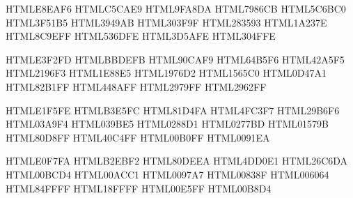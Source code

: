 \definecolor{Indigo-50}       {HTML}{E8EAF6}
\definecolor{Indigo-100}      {HTML}{C5CAE9}
\definecolor{Indigo-200}      {HTML}{9FA8DA}
\definecolor{Indigo-300}      {HTML}{7986CB}
\definecolor{Indigo-400}      {HTML}{5C6BC0}
\definecolor{Indigo-500}      {HTML}{3F51B5}
\definecolor{Indigo-600}      {HTML}{3949AB}
\definecolor{Indigo-700}      {HTML}{303F9F}
\definecolor{Indigo-800}      {HTML}{283593}
\definecolor{Indigo-900}      {HTML}{1A237E}
\definecolor{Indigo-A100}     {HTML}{8C9EFF}
\definecolor{Indigo-A200}     {HTML}{536DFE}
\definecolor{Indigo-A400}     {HTML}{3D5AFE}
\definecolor{Indigo-A700}     {HTML}{304FFE}

\definecolor{Blue-50}         {HTML}{E3F2FD}
\definecolor{Blue-100}        {HTML}{BBDEFB}
\definecolor{Blue-200}        {HTML}{90CAF9}
\definecolor{Blue-300}        {HTML}{64B5F6}
\definecolor{Blue-400}        {HTML}{42A5F5}
\definecolor{Blue-500}        {HTML}{2196F3}
\definecolor{Blue-600}        {HTML}{1E88E5}
\definecolor{Blue-700}        {HTML}{1976D2}
\definecolor{Blue-800}        {HTML}{1565C0}
\definecolor{Blue-900}        {HTML}{0D47A1}
\definecolor{Blue-A100}       {HTML}{82B1FF}
\definecolor{Blue-A200}       {HTML}{448AFF}
\definecolor{Blue-A400}       {HTML}{2979FF}
\definecolor{Blue-A700}       {HTML}{2962FF}

\definecolor{Light-Blue-50}   {HTML}{E1F5FE}
\definecolor{Light-Blue-100}  {HTML}{B3E5FC}
\definecolor{Light-Blue-200}  {HTML}{81D4FA}
\definecolor{Light-Blue-300}  {HTML}{4FC3F7}
\definecolor{Light-Blue-400}  {HTML}{29B6F6}
\definecolor{Light-Blue-500}  {HTML}{03A9F4}
\definecolor{Light-Blue-600}  {HTML}{039BE5}
\definecolor{Light-Blue-700}  {HTML}{0288D1}
\definecolor{Light-Blue-800}  {HTML}{0277BD}
\definecolor{Light-Blue-900}  {HTML}{01579B}
\definecolor{Light-Blue-A100} {HTML}{80D8FF}
\definecolor{Light-Blue-A200} {HTML}{40C4FF}
\definecolor{Light-Blue-A400} {HTML}{00B0FF}
\definecolor{Light-Blue-A700} {HTML}{0091EA}

\definecolor{Cyan-50}         {HTML}{E0F7FA}
\definecolor{Cyan-100}        {HTML}{B2EBF2}
\definecolor{Cyan-200}        {HTML}{80DEEA}
\definecolor{Cyan-300}        {HTML}{4DD0E1}
\definecolor{Cyan-400}        {HTML}{26C6DA}
\definecolor{Cyan-500}        {HTML}{00BCD4}
\definecolor{Cyan-600}        {HTML}{00ACC1}
\definecolor{Cyan-700}        {HTML}{0097A7}
\definecolor{Cyan-800}        {HTML}{00838F}
\definecolor{Cyan-900}        {HTML}{006064}
\definecolor{Cyan-A100}       {HTML}{84FFFF}
\definecolor{Cyan-A200}       {HTML}{18FFFF}
\definecolor{Cyan-A400}       {HTML}{00E5FF}
\definecolor{Cyan-A700}       {HTML}{00B8D4}

